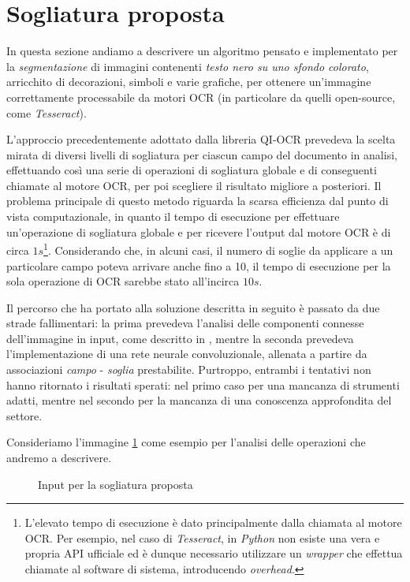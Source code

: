\section{Sogliatura proposta}
\label{sec:image-bin-proposed-approach}
In questa sezione andiamo a descrivere un algoritmo pensato e implementato per la \textit{segmentazione} di immagini contenenti \textit{testo nero su uno sfondo colorato}, arricchito di decorazioni, simboli e varie grafiche, per ottenere un'immagine correttamente processabile da motori OCR (in particolare da quelli open-source, come \textit{Tesseract}).\par
L'approccio precedentemente adottato dalla libreria QI-OCR prevedeva la scelta mirata di diversi livelli di sogliatura per ciascun campo del documento in analisi, effettuando cos\`i una serie di operazioni di sogliatura globale e di conseguenti chiamate al motore OCR, per poi scegliere il risultato migliore a posteriori. Il problema principale di questo metodo riguarda la scarsa efficienza dal punto di vista computazionale, in quanto il tempo di esecuzione per effettuare un'operazione di sogliatura globale e per ricevere l'output dal motore OCR \`e di circa $1s$\footnote{L'elevato tempo di esecuzione \`e dato principalmente dalla chiamata al motore OCR. Per esempio, nel caso di \textit{Tesseract}, in \textit{Python} non esiste una vera e propria API ufficiale ed \`e dunque necessario utilizzare un \textit{wrapper} che effettua chiamate al software di sistema, introducendo \textit{overhead}.}. Considerando che, in alcuni casi, il numero di soglie da applicare a un particolare campo poteva arrivare anche fino a 10, il tempo di esecuzione per la sola operazione di OCR sarebbe stato all'incirca $10s$.\par
Il percorso che ha portato alla soluzione descritta in seguito \`e passato da due strade fallimentari:
la prima prevedeva l'analisi delle componenti connesse dell'immagine in input, come descritto in \cite{bib:text-extraction}, mentre la seconda prevedeva l'implementazione di una rete neurale convoluzionale, allenata a partire da associazioni \textit{campo} - \textit{soglia} prestabilite. Purtroppo, entrambi i tentativi non hanno ritornato i risultati sperati: nel primo caso per una mancanza di strumenti adatti, mentre nel secondo per la mancanza di una conoscenza approfondita del settore.\par
Consideriamo l'immagine \ref{fig:image-bin-proposed-approach-input} come esempio per l'analisi delle operazioni che andremo a descrivere.
\begin{figure}[h]
	\centering
	\caption{Input per la sogliatura proposta}
	\label{fig:image-bin-proposed-approach-input}
\end{figure}

